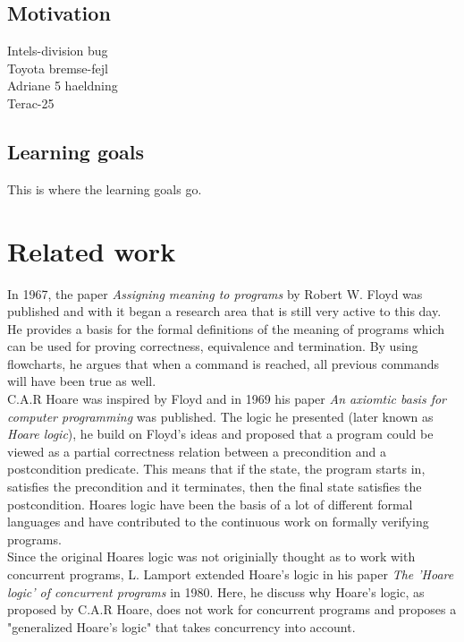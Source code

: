 \documentclass[a4paper]{report}
\begin{document}
\section{Motivation}
Intels-division bug \\
Toyota bremse-fejl\\
Adriane 5 haeldning\\
Terac-25\\
\section{Learning goals}
This is where the learning goals go.
\chapter{Related work}
In 1967, the paper \textit{Assigning meaning to programs}\cite{Floyd1967} by Robert W. Floyd was published and with it began a research area that is still very active to this day. He provides a basis for the formal definitions of the meaning of programs which can be used for proving correctness, equivalence and termination. By using flowcharts, he argues that when a command is reached, all previous commands will have been true as well.\\ C.A.R Hoare was inspired by Floyd and in 1969 his paper \textit{An axiomtic basis for computer programming}\cite{Hoare1969} was published. The logic he presented (later known as \textit{Hoare logic}), he build on Floyd's ideas and proposed that a program could be viewed as a partial correctness relation between a precondition and a postcondition predicate. This means that if the state, the program starts in, satisfies the precondition and it terminates, then the final state satisfies the postcondition. Hoares logic have been the basis of a lot of different formal languages and have contributed to the continuous work on formally verifying programs.\\ Since the original Hoares logic was not originially thought as to work with concurrent programs, L. Lamport extended Hoare's logic in his paper \textit{The 'Hoare logic' of concurrent programs}\cite{Lamport1980} in 1980. Here, he discuss why Hoare's logic, as proposed by C.A.R Hoare, does not work for concurrent programs and proposes a "generalized Hoare's logic" that takes concurrency into account. \\\\
\end{document}
